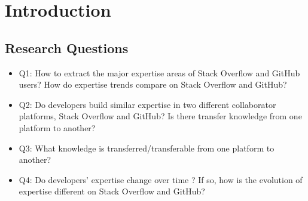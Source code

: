\chapter{Introduction}
\section{Research Questions}

\begin{itemize}
    \item Q1: How to extract the major expertise areas of Stack Overflow and GitHub users? How do expertise trends compare on Stack Overflow and GitHub?
    \item Q2: Do developers build similar expertise in two different collaborator platforms, Stack Overflow and GitHub? Is there transfer knowledge from one platform to another?
    \item Q3: What knowledge is transferred/transferable from one platform to another?
    \item Q4: Do developers' expertise change over time ? If so, how is the evolution of expertise different on Stack Overflow and GitHub?
\end{itemize}
